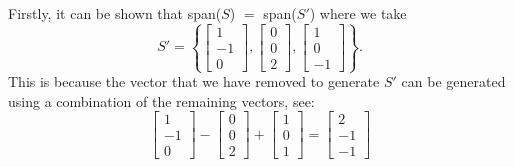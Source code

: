 \documentclass{report}
\begin{document}
\sol Firstly, it can be shown that span($S$) $=$ span($S'$) where we take
$$S'=\left\{\left[\begin{array}{c}
1 \\
-1 \\
0
\end{array}\right],\left[\begin{array}{l}
0 \\
0 \\
2
\end{array}\right],\left[\begin{array}{c}
1 \\
0 \\
-1
\end{array}\right]\right\}.$$
This is because the vector that we have removed to generate $S'$ can be generated using a combination of the remaining vectors, see:
$$
\begin{bmatrix} 1 \\ -1 \\ 0 \end{bmatrix} - 
\begin{bmatrix} 0 \\ 0 \\ 2 \end{bmatrix} +
\begin{bmatrix} 1 \\ 0 \\ 1 \end{bmatrix} =
\begin{bmatrix} 2 \\ -1 \\ -1 \end{bmatrix}
$$
\end{document}
